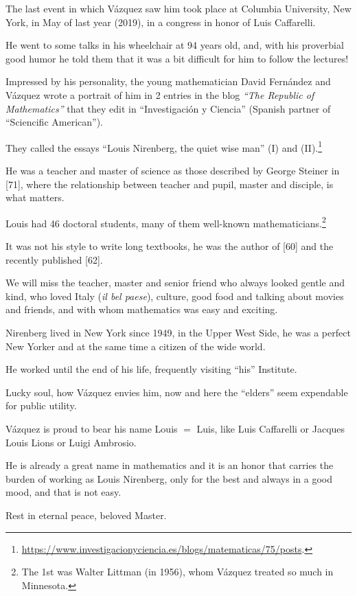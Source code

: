\documentclass{article}
\begin{document}
The last event in which V\'azquez saw him took place at Columbia University, New York, in May of last year (2019), in a congress in honor of Luis Caffarelli.

He went to some talks in his wheelchair at 94 years old, and, with his proverbial good humor he told them that it was a bit difficult for him to follow the lectures!

%
Impressed by his personality, the young mathematician David Fern\'andez and V\'azquez wrote a portrait of him in 2 entries in the blog \textit{``The Republic of Mathematics''} that they edit in ``Investigaci\'on y Ciencia'' (Spanish partner of ``Sciencific American'').

They called the essays ``Louis Nirenberg, the quiet wise man'' (I) and (II).\footnote{\url{https://www.investigacionyciencia.es/blogs/matematicas/75/posts}.}

He was a teacher and master of science as those described by George Steiner in [71], where the relationship between teacher and pupil, master and disciple, is what matters.

Louis had 46 doctoral students, many of them well-known mathematicians.\footnote{The 1st was Walter Littman (in 1956), whom V\'azquez treated so much in Minnesota.}

It was not his style to write long textbooks, he was the author of [60] and the recently published [62].

%
We will miss the teacher, master and senior friend who always looked gentle and kind, who loved Italy (\textit{il bel paese}), culture, good food and talking about movies and friends, and with whom mathematics was easy and exciting.

Nirenberg lived in New York since 1949, in the Upper West Side, he was a perfect New Yorker and at the same time a citizen of the wide world.

He worked until the end of his life, frequently visiting ``his'' Institute.

Lucky soul, how V\'azquez envies him, now and here the ``elders'' seem expendable for public utility.

%
V\'azquez is proud to bear his name Louis $=$ Luis, like Luis Caffarelli or Jacques Louis Lions or Luigi Ambrosio.

He is already a great name in mathematics and it is an honor that carries the burden of working as Louis Nirenberg, only for the best and always in a good mood, and that is not easy.

Rest in eternal peace, beloved Master.
\end{document}
